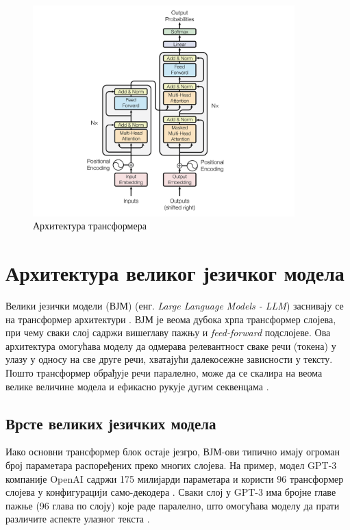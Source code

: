 \begin{figure}[h]
    \centering
    \includegraphics[width=0.9\textwidth]{images/transformer.png}
    \caption{Архитектура трансформера}
    \label{fig:transformer}
\end{figure}

\section{Архитектура великог језичког модела}
\label{sec:llm_architecture}

Велики језички модели (ВЈМ) (енг. \textit{Large Language Models - LLM}) заснивају се на трансформер архитектури \cite{vaswani_attention_2017}. ВЈМ је веома дубока хрпа трансформер слојева, при чему сваки слој садржи вишеглаву пажњу и \textit{feed-forward} подслојеве. Ова архитектура омогућава моделу да одмерава релевантност сваке речи (токена) у улазу у односу на све друге речи, хватајући далекосежне зависности у тексту. Пошто трансформер обрађује речи паралелно, може да се скалира на веома велике величине модела и ефикасно рукује дугим секвенцама \cite{vaswani_attention_2017}.

\subsection{Врсте великих језичких модела}

Иако основни трансформер блок остаје језгро, ВЈМ-ови типично имају огроман број параметара распоређених преко многих слојева. На пример, модел GPT-3 компаније OpenAI садржи 175 милијарди параметара и користи 96 трансформер слојева у конфигурацији само-декодера \cite{brown_language_2020}. Сваки слој у GPT-3 има бројне главе пажње (96 глава по слоју) које раде паралелно, што омогућава моделу да прати различите аспекте улазног текста \cite{brown_language_2020}.

